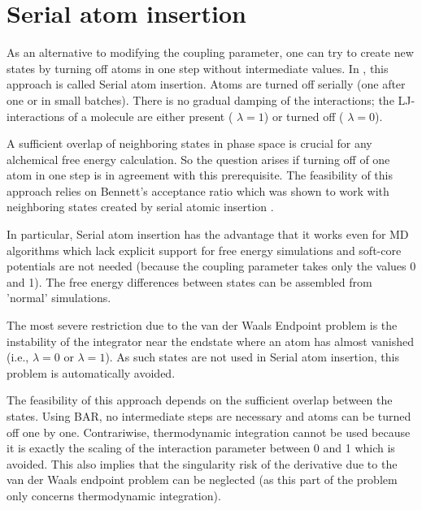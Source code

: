 \section{Serial atom insertion}

As an alternative to modifying the coupling parameter, one can
try to create new states by turning off atoms in one step without
intermediate values. In \cite{Boresch.2011}, this approach is called
Serial atom insertion. Atoms are turned off serially (one after one
or in small batches). There is no gradual damping of the interactions; the
LJ-interactions of a molecule are either present ( $\lambda=1$) or
turned off ( $\lambda=0$).

A sufficient overlap of neighboring states in phase space is crucial
for any alchemical free energy calculation. So the question arises
if turning off of one atom in one step is in agreement with this prerequisite. The feasibility of this approach relies on Bennett's acceptance
ratio which was shown to work with neighboring states created
by serial atomic insertion \cite{Boresch.2011}.

In particular, Serial atom insertion has the advantage that it works
even for MD algorithms which lack explicit support for free energy
simulations and soft-core potentials are not needed (because the coupling
parameter takes only the values 0 and 1). The free energy differences
between states can be assembled from 'normal' simulations.

The most severe restriction due to the van der Waals Endpoint
problem is the instability of the integrator near the endstate where an atom has almost vanished (i.e.,  $\lambda=0$ or  $\lambda=1$). As such states
are not used in Serial atom insertion, this problem is automatically
avoided.

The feasibility of this approach depends on the sufficient overlap
between the states. Using BAR, no intermediate steps are necessary
and atoms can be turned off one by one. Contrariwise, thermodynamic
integration cannot be used because it is exactly the scaling of the
interaction parameter between 0 and 1 which is avoided. This also
implies that the singularity risk of the derivative due to the van
der Waals endpoint problem can be neglected (as this part of the problem
only concerns thermodynamic integration).